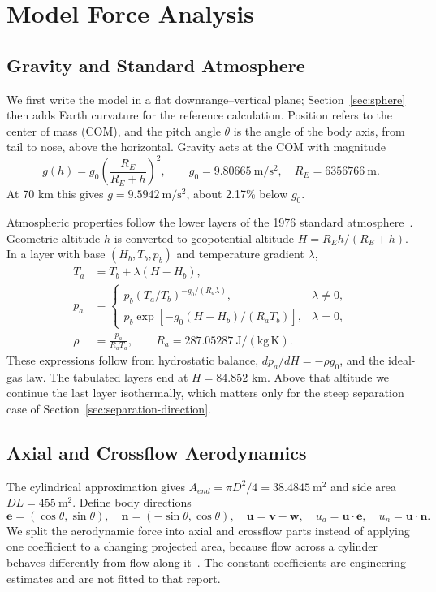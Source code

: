\section{Model Force Analysis}
\subsection{Gravity and Standard Atmosphere}
We first write the model in a flat downrange--vertical plane; Section~\ref{sec:sphere} then adds Earth curvature for the reference calculation. Position refers to the center of mass (COM), and the pitch angle $\theta$ is the angle of the body axis, from tail to nose, above the horizontal. Gravity acts at the COM with magnitude
\begin{equation}
 g(h)=g_0\left(\frac{R_E}{R_E+h}\right)^2,\qquad g_0=9.80665\ \mathrm{m/s^2},\quad R_E=6356766\ \mathrm m.
\end{equation}
At 70 km this gives $g=9.5942\ \mathrm{m/s^2}$, about 2.17\% below $g_0$.

Atmospheric properties follow the lower layers of the 1976 standard atmosphere~\cite{atmosphere}. Geometric altitude $h$ is converted to geopotential altitude $H=R_Eh/(R_E+h)$. In a layer with base $(H_b,T_b,p_b)$ and temperature gradient $\lambda$,
\begin{align}
 T_a&=T_b+\lambda(H-H_b),\\
 p_a&=\begin{cases}p_b(T_a/T_b)^{-g_0/(R_a\lambda)},&\lambda\ne0,\\p_b\exp[-g_0(H-H_b)/(R_aT_b)],&\lambda=0,\end{cases}\\
 \rho&=\frac{p_a}{R_aT_a},\qquad R_a=287.05287\ \mathrm{J/(kg\,K)}.
\end{align}
These expressions follow from hydrostatic balance, $dp_a/dH=-\rho g_0$, and the ideal-gas law. The tabulated layers end at $H=84.852$ km. Above that altitude we continue the last layer isothermally, which matters only for the steep separation case of Section~\ref{sec:separation-direction}.

\subsection{Axial and Crossflow Aerodynamics}
The cylindrical approximation gives $A_{end}=\pi D^2/4=38.4845\ \mathrm{m^2}$ and side area $DL=455\ \mathrm{m^2}$. Define body directions
\begin{equation}
 \mathbf e=(\cos\theta,\sin\theta),\quad \mathbf n=(-\sin\theta,\cos\theta),\quad
 \mathbf u=\mathbf v-\mathbf w,\quad u_a=\mathbf u\cdot\mathbf e,\quad u_n=\mathbf u\cdot\mathbf n.
\end{equation}
We split the aerodynamic force into axial and crossflow parts instead of applying one coefficient to a changing projected area, because flow across a cylinder behaves differently from flow along it~\cite{cylinder}. The constant coefficients are engineering estimates and are not fitted to that report.

